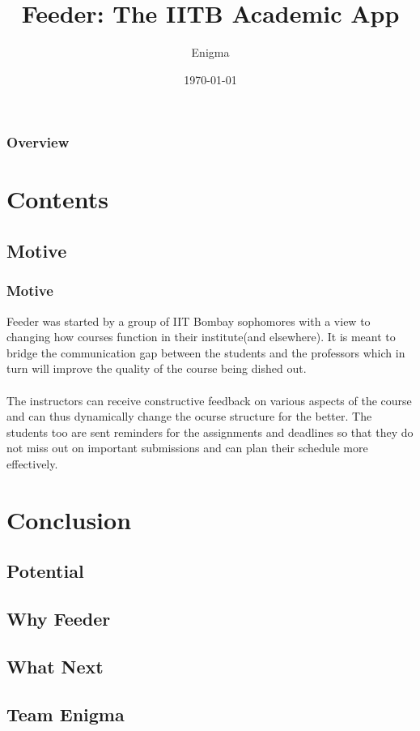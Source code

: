 \documentclass{beamer}
\title[Feeder]{Feeder: The IITB Academic App}
\author{Enigma}
\institute[IITB]
{
IIT Bombay \\
\medskip
\textbf{Group 01} 
}
\date{\today}
\begin{document}
\begin{frame}
\titlepage 
\end{frame}

\begin{frame}
\frametitle{Overview} 
\tableofcontents 
\end{frame}

\section{Contents}
\subsection{Motive}   

\begin{frame}
\frametitle{Motive}
Feeder was started by a group of IIT Bombay sophomores with a view to changing how courses function in their institute(and elsewhere). It is meant to bridge the communication gap between the students and the professors which in turn will improve the quality of the course being dished out. \\~\\

The instructors can receive constructive feedback on various aspects of the course and can thus dynamically change the ocurse structure for the better. The students too are sent reminders for the assignments and deadlines so that they do not miss out on important submissions and can plan their schedule more effectively.
\end{frame}



\section{Conclusion}
\subsection{Potential}
\subsection{Why Feeder}
\subsection{What Next} 
\subsection{Team Enigma} 
\end{document}
